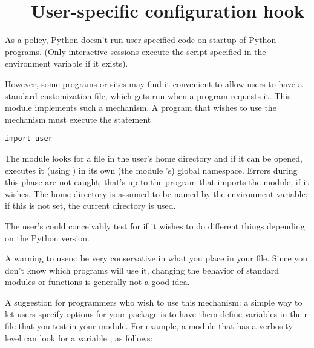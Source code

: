 \section{ ---
         User-specific configuration hook}




As a policy, Python doesn't run user-specified code on startup of
Python programs.  (Only interactive sessions execute the script
specified in the  environment variable if it
exists).

However, some programs or sites may find it convenient to allow users
to have a standard customization file, which gets run when a program
requests it.  This module implements such a mechanism.  A program
that wishes to use the mechanism must execute the statement

\begin{verbatim}
import user
\end{verbatim}

The  module looks for a file  in the user's
home directory and if it can be opened, executes it (using
) in its own (the
module 's) global namespace.  Errors during this phase
are not caught; that's up to the program that imports the
 module, if it wishes.  The home directory is assumed to
be named by the  environment variable; if this is not set,
the current directory is used.

The user's  could conceivably test for
 if it wishes to do different things depending on
the Python version.

A warning to users: be very conservative in what you place in your
 file.  Since you don't know which programs will
use it, changing the behavior of standard modules or functions is
generally not a good idea.

A suggestion for programmers who wish to use this mechanism: a simple
way to let users specify options for your package is to have them
define variables in their  file that you test in
your module.  For example, a module  that has a verbosity
level can look for a variable , as follows:

